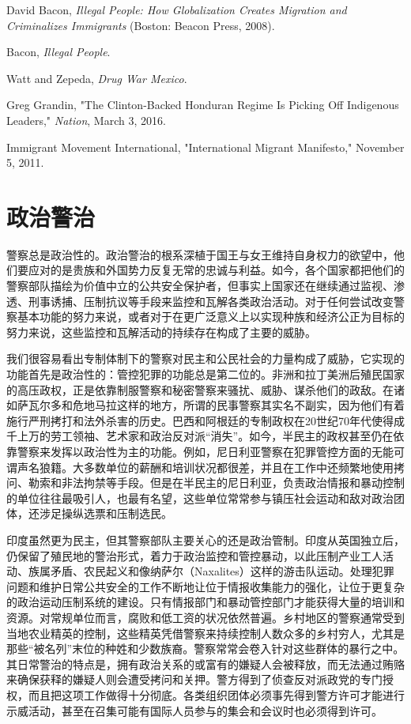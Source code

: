 \documentclass[fontset=fandol, a4paper, 12pt, openright]{ctexbook}
\begin{document}
\begin{enumerate}[label={[\arabic*]}]
    \item David Bacon, \textit{Illegal People: How Globalization Creates Migration and Criminalizes Immigrants} (Boston: Beacon Press, 2008).
    \item Bacon, \textit{Illegal People}.
    \item Watt and Zepeda, \textit{Drug War Mexico}.
    \item Greg Grandin, "The Clinton-Backed Honduran Regime Is Picking Off Indigenous Leaders," \textit{Nation}, March 3, 2016.
    \item Immigrant Movement International, "International Migrant Manifesto," November 5, 2011.
\end{enumerate}

\chapter{政治警治}

警察总是政治性的。政治警治的根系深植于国王与女王维持自身权力的欲望中，他们要应对的是贵族和外国势力反复无常的忠诚与利益。如今，各个国家都把他们的警察部队描绘为价值中立的公共安全保护者，但事实上国家还在继续通过监视、渗透、刑事诱捕、压制抗议等手段来监控和瓦解各类政治活动。对于任何尝试改变警察基本功能的努力来说，或者对于在更广泛意义上以实现种族和经济公正为目标的努力来说，这些监控和瓦解活动的持续存在构成了主要的威胁。

我们很容易看出专制体制下的警察对民主和公民社会的力量构成了威胁，它实现的功能首先是政治性的：管控犯罪的功能总是第二位的。非洲和拉丁美洲后殖民国家的高压政权，正是依靠制服警察和秘密警察来骚扰、威胁、谋杀他们的政敌。在诸如萨瓦尔多和危地马拉这样的地方，所谓的民事警察其实名不副实，因为他们有着施行严刑拷打和法外杀害的历史。巴西和阿根廷的专制政权在20世纪70年代使得成千上万的劳工领袖、艺术家和政治反对派“消失”。如今，半民主的政权甚至仍在依靠警察来发挥以政治性为主的功能。例如，尼日利亚警察在犯罪管控方面的无能可谓声名狼籍。大多数单位的薪酬和培训状况都很差，并且在工作中还频繁地使用拷问、勒索和非法拘禁等手段。但是在半民主的尼日利亚，负责政治情报和暴动控制的单位往往最吸引人，也最有名望，这些单位常常参与镇压社会运动和敌对政治团体，还涉足操纵选票和压制选民。

印度虽然更为民主，但其警察部队主要关心的还是政治管制。印度从英国独立后，仍保留了殖民地的警治形式，着力于政治监控和管控暴动，以此压制产业工人活动、族属矛盾、农民起义和像纳萨尔（Naxalites）这样的游击队运动。处理犯罪问题和维护日常公共安全的工作不断地让位于情报收集能力的强化，让位于更复杂的政治运动压制系统的建设。只有情报部门和暴动管控部门才能获得大量的培训和资源。对常规单位而言，腐败和低工资的状况依然普遍。乡村地区的警察通常受到当地农业精英的控制，这些精英凭借警察来持续控制人数众多的乡村穷人，尤其是那些“被名列”末位的种姓和少数族裔。警察常常会卷入针对这些群体的暴行之中。其日常警治的特点是，拥有政治关系的或富有的嫌疑人会被释放，而无法通过贿赂来确保获释的嫌疑人则会遭受拷问和关押。警方得到了侦查反对派政党的专门授权，而且把这项工作做得十分彻底。各类组织团体必须事先得到警方许可才能进行示威活动，甚至在召集可能有国际人员参与的集会和会议时也必须得到许可。
\end{document}
